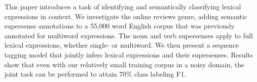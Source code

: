 This paper introduces a task of identifying and semantically classifying lexical expressions in context. We investigate the online reviews genre, adding semantic supersense annotations to a 55,000 word English corpus that was previously annotated for multiword expressions. The noun and verb supersenses apply to full lexical expressions, whether single- or multiword. We then present a sequence tagging model that jointly infers lexical expressions and their supersenses. Results show that even with our relatively small training corpus in a noisy domain, the joint task can be performed to attain 70\% class labeling F1.
